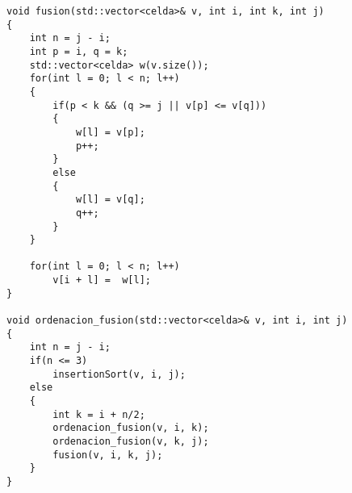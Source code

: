 \begin{lstlisting}
void fusion(std::vector<celda>& v, int i, int k, int j)
{
    int n = j - i;
    int p = i, q = k;
    std::vector<celda> w(v.size());
    for(int l = 0; l < n; l++)
    {
        if(p < k && (q >= j || v[p] <= v[q]))
        {
            w[l] = v[p];
            p++;
        }
        else
        {
            w[l] = v[q];
            q++;
        }
    }

    for(int l = 0; l < n; l++)
        v[i + l] =  w[l];
}

void ordenacion_fusion(std::vector<celda>& v, int i, int j)
{
    int n = j - i;
    if(n <= 3)
        insertionSort(v, i, j);
    else
    {
        int k = i + n/2;
        ordenacion_fusion(v, i, k);
        ordenacion_fusion(v, k, j);
        fusion(v, i, k, j); 
    }
}
\end{lstlisting}